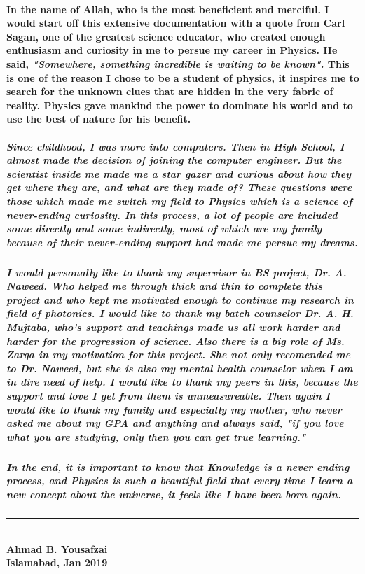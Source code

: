 \documentclass[12pt]{report}
\begin{document}
\paragraph{ \normalfont In the name of Allah, who is the most beneficient and merciful. I would start off this extensive documentation with a quote from Carl Sagan, one of the greatest science educator, who created enough enthusiasm and curiosity in me to persue my career in Physics. He said, \textit{"Somewhere, something incredible is waiting to be known".} This is one of the reason I chose to be a student of physics, it inspires me to search for the unknown clues that are hidden in the very fabric of reality. Physics gave mankind the power to dominate his world and to use the best of nature for his benefit.}
\subparagraph{ \normalfont Since childhood, I was more into computers. Then in High School, I almost made the decision of joining the computer engineer. But the scientist inside me made me a star gazer and curious about how they get where they are, and what are they made of? These questions were those which made me switch my field to Physics which is a science of never-ending curiosity. In this process, a lot of people are included some directly and some indirectly, most of which are my family because of their never-ending support had made me persue my dreams.}
\subparagraph{ \normalfont I would personally like to thank my supervisor in BS project, Dr. A. Naweed. Who helped me through thick and thin to complete this project and who kept me motivated enough to continue my research in field of photonics. I would like to thank my batch counselor Dr. A. H. Mujtaba, who's support and teachings made us all work harder and harder for the progression of science. Also there is a big role of Ms. Zarqa in my motivation for this project. She not only recomended me to Dr. Naweed, but she is also my mental health counselor when I am in dire need of help. I would like to thank my peers in this, because the support and love I get from them is unmeasureable. Then again I would like to thank my family and especially my mother, who never asked me about my GPA and anything and always said, "if you love what you are studying, only then you can get true learning."}
\subparagraph*{ \normalfont	In the end, it is important to know that Knowledge is a never ending process, and Physics is such a beautiful field that every time I learn a new concept about the universe, it feels like I have been born again.}
\begin{flushleft}
\noindent\rule{5cm}{0.5pt}\\
\textbf{\small Ahmad B. Yousafzai}\\
\textbf{\small Islamabad, Jan 2019}
\end{flushleft}
\end{document}
